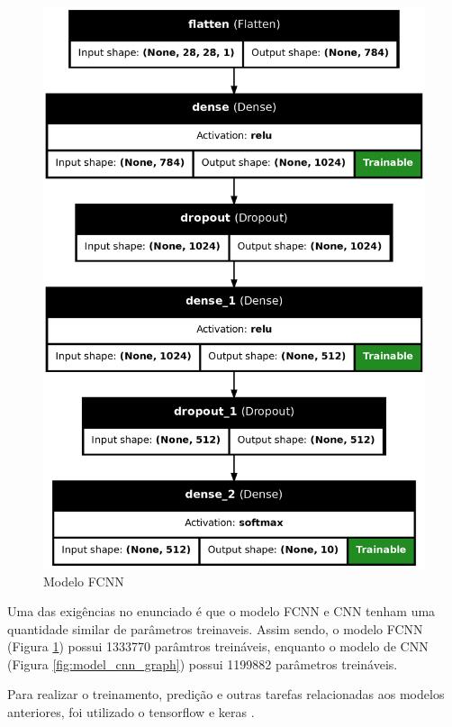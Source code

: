 \documentclass[12pt]{article}
\begin{document}
\begin{figure}[H]
\begin{minipage}{0.4\textwidth}
    \includegraphics[width=\textwidth]{../images/models/model_fcnn_graph.png}
    \caption{Modelo FCNN}
    \label{fig:model_fcnn_graph}
  \end{minipage}
\end{figure}

Uma das exigências no enunciado é que o modelo FCNN e CNN tenham uma quantidade similar de parâmetros treinaveis. Assim sendo, o modelo FCNN (Figura \ref{fig:model_fcnn_graph}) possui 1333770 parâmtros treináveis, enquanto o modelo de CNN (Figura \ref{fig:model_cnn_graph}) possui 1199882 parâmetros treináveis.

Para realizar o treinamento, predição e outras tarefas relacionadas aos modelos anteriores, foi utilizado o tensorflow \cite{tensorflow2015-whitepaper} e keras \cite{chollet2015keras}.
\end{document}
